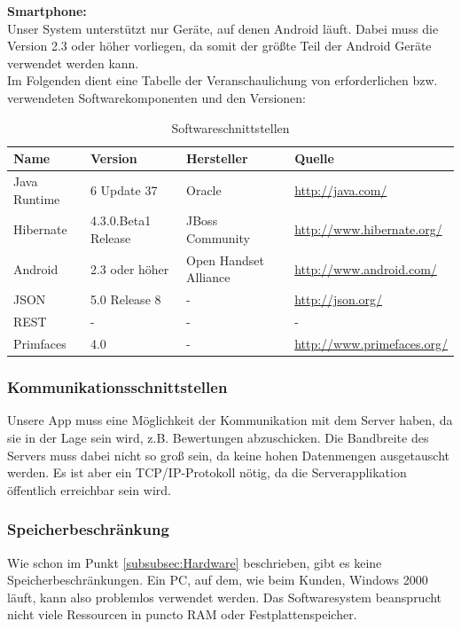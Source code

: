 \documentclass[fontsize=12pt,paper=a4,twoside]{scrartcl}
\begin{document}
\textbf{Smartphone:}\\
Unser System unterstützt nur Geräte, auf denen Android läuft. Dabei muss die Version 2.3 oder höher vorliegen, da somit der größte Teil der Android Geräte verwendet werden kann.\\
Im Folgenden dient eine Tabelle der Veranschaulichung von erforderlichen bzw. verwendeten Softwarekomponenten und den Versionen: 
\begin{table}
	[H] \label{tab:SoftwareSchnittstellen} \caption{Softwareschnittstellen} \centering 
	\begin{tabular}
		{|l|l|l|l|}\hline \textbf{Name} & \textbf{Version} & \textbf{Hersteller} & \textbf{Quelle} \\\hline Java Runtime & 6 Update 37 & Oracle & \url{http://java.com/} \\\hline Hibernate & 4.3.0.Beta1 Release& JBoss Community & \url{http://www.hibernate.org/}\\\hline Android & 2.3 oder höher & Open Handset Alliance & \url{http://www.android.com/} \\\hline JSON & 5.0 Release 8 & - & \url{http://json.org/} \\\hline REST & - & - & - \\\hline Primfaces & 4.0 & - & \url{http://www.primefaces.org/} \\\hline 
	\end{tabular}
\end{table}

\subsubsection{Kommunikationsschnittstellen} \label{subsubsec:KommunikationsSchnittstellen} Unsere App muss eine Möglichkeit der Kommunikation mit dem Server haben, da sie in der Lage sein wird, z.B. Bewertungen abzuschicken. Die Bandbreite des Servers muss dabei nicht so groß sein, da keine hohen Datenmengen ausgetauscht werden. Es ist aber ein TCP/IP-Protokoll nötig, da die Serverapplikation öffentlich erreichbar sein wird.

\subsubsection{Speicherbeschränkung} \label{subsubsec:Speicherbeschr.} Wie schon im Punkt \ref{subsubsec:Hardware} beschrieben, gibt es keine Speicherbeschränkungen. Ein PC, auf dem, wie beim Kunden, Windows 2000 läuft, kann also problemlos verwendet werden. Das Softwaresystem beansprucht nicht viele Ressourcen in puncto RAM oder Festplattenspeicher.
\end{document}
